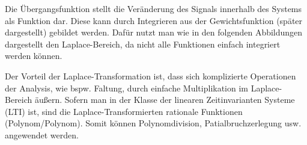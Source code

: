 Die Übergangsfunktion stellt die Veränderung des Signals innerhalb des Systems als Funktion dar. Diese
kann durch Integrieren aus der Gewichtsfunktion (später dargestellt) gebildet werden. Dafür nutzt man wie
in den folgenden Abbildungen dargestellt den Laplace-Bereich, da nicht alle Funktionen einfach integriert
werden können.
\vspace*{0.5cm}
\begin{figure}[H]
    \begin{center}
    \end{center}
\end{figure}
\vspace*{0.5cm}
Der Vorteil der Laplace-Transformation ist, dass sich komplizierte Operationen der Analysis, wie bspw. Faltung, durch einfache Multiplikation im Laplace-Bereich äußern. Sofern man in der Klasse der linearen Zeitinvarianten Systeme (LTI) ist, sind die Laplace-Transformierten rationale Funktionen (Polynom/Polynom). Somit können Polynomdivision, Patialbruchzerlegung usw. angewendet werden.